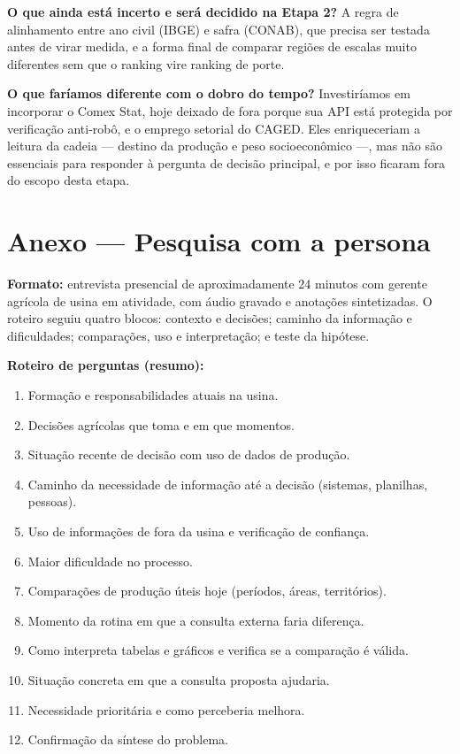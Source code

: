 \documentclass[11pt,a4paper]{article}
\begin{document}
\textbf{O que ainda está incerto e será decidido na Etapa 2?} A regra de alinhamento entre ano
civil (IBGE) e safra (CONAB), que precisa ser testada antes de virar medida, e a forma final de
comparar regiões de escalas muito diferentes sem que o ranking vire ranking de porte.

\textbf{O que faríamos diferente com o dobro do tempo?} Investiríamos em incorporar o Comex
Stat, hoje deixado de fora porque sua API está protegida por verificação anti-robô, e o
emprego setorial do CAGED. Eles enriqueceriam a leitura da cadeia — destino da produção e peso
socioeconômico —, mas não são essenciais para responder à pergunta de decisão principal, e por
isso ficaram fora do escopo desta etapa.

\newpage
\section*{Anexo — Pesquisa com a persona}

\textbf{Formato:} entrevista presencial de aproximadamente 24 minutos com gerente agrícola de
usina em atividade, com áudio gravado e anotações sintetizadas. O roteiro seguiu quatro blocos:
contexto e decisões; caminho da informação e dificuldades; comparações, uso e interpretação;
e teste da hipótese.

\textbf{Roteiro de perguntas (resumo):}
\begin{enumerate}
  \item Formação e responsabilidades atuais na usina.
  \item Decisões agrícolas que toma e em que momentos.
  \item Situação recente de decisão com uso de dados de produção.
  \item Caminho da necessidade de informação até a decisão (sistemas, planilhas, pessoas).
  \item Uso de informações de fora da usina e verificação de confiança.
  \item Maior dificuldade no processo.
  \item Comparações de produção úteis hoje (períodos, áreas, territórios).
  \item Momento da rotina em que a consulta externa faria diferença.
  \item Como interpreta tabelas e gráficos e verifica se a comparação é válida.
  \item Situação concreta em que a consulta proposta ajudaria.
  \item Necessidade prioritária e como perceberia melhora.
  \item Confirmação da síntese do problema.
\end{enumerate}
\end{document}
